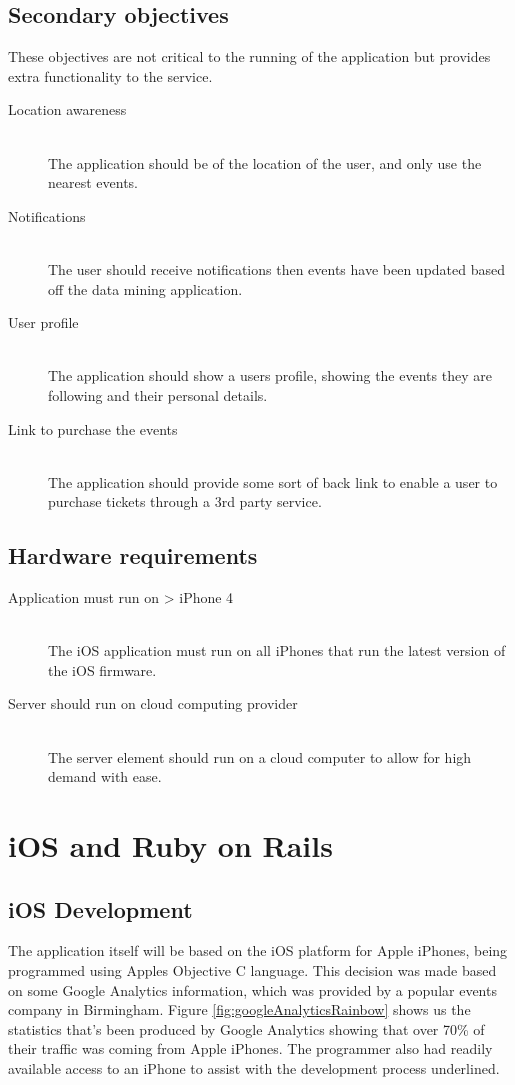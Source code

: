 	\subsection{Secondary objectives}
		These objectives are not critical to the running of the application but provides extra functionality to the service. 

		\begin{description}
			\item[Location awareness] \hfill \\
				The application should be  of the location of the user, and only use the nearest events. 
			\item[Notifications] \hfill \\
				The user should receive notifications then events have been updated based off the data mining application.
			\item [User profile] \hfill \\
				The application should show a users profile, showing the events they are following and their personal details.
			\item[Link to purchase the events] \hfill \\
				The application should provide some sort of back link to enable a user to purchase tickets through a 3rd party service. 
		\end{description}

	\subsection{Hardware requirements}
		\begin{description}
			\item[Application must run on > iPhone 4] \hfill \\
				The iOS application must run on all iPhones that run the latest version of the iOS firmware.
			\item[Server should run on cloud computing provider] \hfill \\
				The server element should run on a cloud computer to allow for high demand with ease. 
		\end{description}

\section{iOS and Ruby on Rails}

	\subsection{iOS Development}
	The application itself will be based on the iOS platform for Apple iPhones, being programmed using Apples Objective C language. This decision was made based on some Google Analytics information, which was provided by a popular events company in Birmingham. Figure \ref{fig:googleAnalyticsRainbow} shows us the statistics that's been produced by Google Analytics showing that over 70\% of their traffic was coming from Apple iPhones. The programmer also had readily available access to an iPhone to assist with the development process underlined. 

